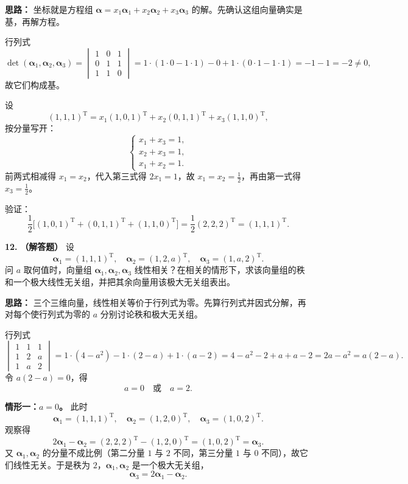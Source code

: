 \ifshowsolutions%
\quad
\textbf{思路：} 坐标就是方程组 $\boldsymbol{\alpha}=x_1\boldsymbol{\alpha}_1+x_2\boldsymbol{\alpha}_2+x_3\boldsymbol{\alpha}_3$ 的解。先确认这组向量确实是基，再解方程。

行列式
\[
\det(\boldsymbol{\alpha}_1,\boldsymbol{\alpha}_2,\boldsymbol{\alpha}_3)
=\begin{vmatrix}
1&0&1\\
0&1&1\\
1&1&0
\end{vmatrix}
=1\cdot(1\cdot 0-1\cdot 1)-0+1\cdot(0\cdot 1-1\cdot 1)
=-1-1=-2\neq 0,
\]
故它们构成基。

设
\[
(1,1,1)^\mathrm{T}=x_1(1,0,1)^\mathrm{T}+x_2(0,1,1)^\mathrm{T}+x_3(1,1,0)^\mathrm{T},
\]
按分量写开：
\[
\begin{cases}
x_1+x_3=1,\\
x_2+x_3=1,\\
x_1+x_2=1.
\end{cases}
\]
前两式相减得 $x_1=x_2$，代入第三式得 $2x_1=1$，故 $x_1=x_2=\frac12$，再由第一式得 $x_3=\frac12$。

验证：
\[
\frac12\bigl[(1,0,1)^\mathrm{T}+(0,1,1)^\mathrm{T}+(1,1,0)^\mathrm{T}\bigr]
=\frac12(2,2,2)^\mathrm{T}=(1,1,1)^\mathrm{T}.
\]

\else \answerarea[8] \fi%

\textbf{12.} \textbf{（解答题）} 设
\[
\boldsymbol{\alpha}_1=(1,1,1)^\mathrm{T},\quad
\boldsymbol{\alpha}_2=(1,2,a)^\mathrm{T},\quad
\boldsymbol{\alpha}_3=(1,a,2)^\mathrm{T}.
\]
问 $a$ 取何值时，向量组 $\boldsymbol{\alpha}_1,\boldsymbol{\alpha}_2,\boldsymbol{\alpha}_3$ 线性相关？在相关的情形下，求该向量组的秩和一个极大线性无关组，并把其余向量用该极大无关组表出。

\ifshowsolutions%
\quad
\textbf{思路：} 三个三维向量，线性相关等价于行列式为零。先算行列式并因式分解，再对每个使行列式为零的 $a$ 分别讨论秩和极大无关组。

行列式
\[
\begin{vmatrix}
1&1&1\\
1&2&a\\
1&a&2
\end{vmatrix}
=1\cdot(4-a^2)-1\cdot(2-a)+1\cdot(a-2)
=4-a^2-2+a+a-2
=2a-a^2=a(2-a).
\]
令 $a(2-a)=0$，得
\[
a=0\quad\text{或}\quad a=2.
\]

\textbf{情形一：$a=0$。} 此时
\[
\boldsymbol{\alpha}_1=(1,1,1)^\mathrm{T},\quad
\boldsymbol{\alpha}_2=(1,2,0)^\mathrm{T},\quad
\boldsymbol{\alpha}_3=(1,0,2)^\mathrm{T}.
\]
观察得
\[
2\boldsymbol{\alpha}_1-\boldsymbol{\alpha}_2
=(2,2,2)^\mathrm{T}-(1,2,0)^\mathrm{T}=(1,0,2)^\mathrm{T}=\boldsymbol{\alpha}_3.
\]
又 $\boldsymbol{\alpha}_1,\boldsymbol{\alpha}_2$ 的分量不成比例（第二分量 $1$ 与 $2$ 不同，第三分量 $1$ 与 $0$ 不同），故它们线性无关。于是秩为 $2$，$\boldsymbol{\alpha}_1,\boldsymbol{\alpha}_2$ 是一个极大无关组，
\[
\boldsymbol{\alpha}_3=2\boldsymbol{\alpha}_1-\boldsymbol{\alpha}_2.
\]

